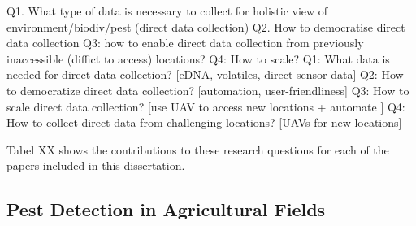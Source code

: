 Q1. What type of data is necessary to collect for holistic view of environment/biodiv/pest (direct data collection)
Q2. How to democratise direct data collection
Q3: how to enable direct data collection from previously inaccessible (diffict to access) locations?
Q4: How to scale?
Q1: What data is needed for direct data collection? [eDNA, volatiles, direct sensor data]
Q2: How to democratize direct data collection? [automation, user-friendliness]
Q3: How to scale direct data collection? [use UAV to access new locations + automate ]
Q4: How to collect direct data from challenging locations? [UAVs for new locations]

Tabel XX shows the contributions to these research questions for each of the papers included in this dissertation. 

\subsection{Pest Detection in Agricultural Fields}


